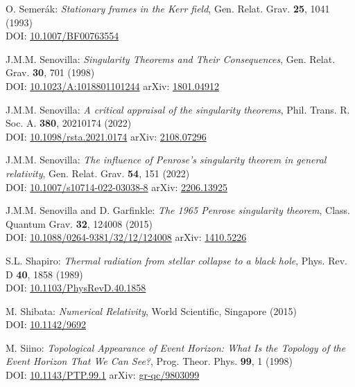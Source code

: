 \begin{thebibliography}{123}
O. Semer\'ak:
{\em Stationary frames in the Kerr field},
Gen. Relat. Grav. {\bf 25}, 1041 (1993)\\
DOI: \href{https://doi.org/10.1007/BF00763554}{10.1007/BF00763554}

J.M.M. Senovilla:
{\em Singularity Theorems and Their Consequences},
Gen. Relat. Grav. {\bf 30}, 701 (1998)\\
DOI: \href{https://doi.org/10.1023/A:1018801101244}{10.1023/A:1018801101244}\hfill
arXiv: \href{https://arxiv.org/abs/1801.04912}{1801.04912}

J.M.M. Senovilla:
{\em A critical appraisal of the singularity theorems},
Phil. Trans. R. Soc. A. {\bf 380}, 20210174 (2022)\\
DOI: \href{https://doi.org/10.1098/rsta.2021.0174}{10.1098/rsta.2021.0174}\hfill
arXiv: \href{https://arxiv.org/abs/2108.07296}{2108.07296}

J.M.M. Senovilla:
{\em The influence of Penrose’s singularity theorem in general relativity},
Gen. Relat. Grav.  {\bf 54}, 151 (2022)\\
DOI: \href{https://doi.org/10.1007/s10714-022-03038-8}{10.1007/s10714-022-03038-8}\hfill
arXiv: \href{https://arxiv.org/abs/2206.13925}{2206.13925}

J.M.M. Senovilla and D. Garfinkle:
{\em The 1965 Penrose singularity theorem},
Class. Quantum Grav. {\bf 32}, 124008 (2015)\\
DOI: \href{https://doi.org/10.1088/0264-9381/32/12/124008}{10.1088/0264-9381/32/12/124008}\hfill
arXiv: \href{https://arxiv.org/abs/1410.5226}{1410.5226}

S.L. Shapiro:
{\em Thermal radiation from stellar collapse to a black hole},
Phys. Rev. D {\bf 40}, 1858 (1989)\\
DOI: \href{https://doi.org/10.1103/PhysRevD.40.1858}{10.1103/PhysRevD.40.1858}

M. Shibata:
{\em Numerical Relativity},
World Scientific, Singapore (2015)\\
DOI: \href{https://doi.org/10.1142/9692}{10.1142/9692}

M. Siino: {\em Topological Appearance of Event Horizon:
What Is the Topology of the Event Horizon That We Can See?},
Prog. Theor. Phys. {\bf 99}, 1 (1998)\\
DOI: \href{https://doi.org/10.1143/PTP.99.1}{10.1143/PTP.99.1}\hfill
arXiv: \href{https://arxiv.org/abs/gr-qc/9803099}{gr-qc/9803099}


\end{thebibliography}
